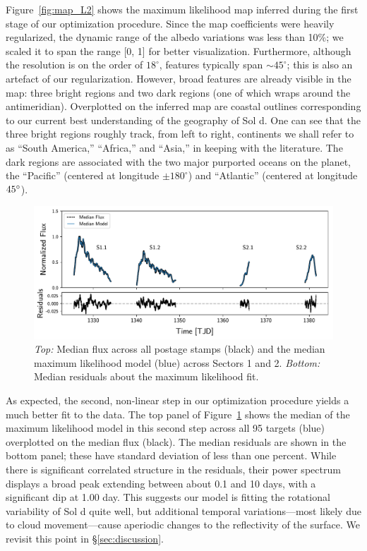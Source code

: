 \documentclass[modern]{aastex62}
\begin{document}
Figure~\ref{fig:map_L2} shows the maximum likelihood map inferred
during the first stage of our optimization procedure. Since the map
coefficients were heavily regularized, the dynamic range of the albedo
variations was less than 10\%; we scaled it to span the range [0, 1]
for better visualization. Furthermore, although the resolution is on 
the order of $18^\circ$, features typically span ${\sim}45^\circ$; this is
also an artefact of our regularization. However, broad features are already
visible in the map: three bright regions and two dark regions (one of which
wraps around the antimeridian). Overplotted on the inferred map are
coastal outlines corresponding to our current best understanding of 
the geography of Sol d. One can see that the three bright regions roughly
track, from left to right, continents we shall refer to as ``South America,''
``Africa,'' and ``Asia,'' in keeping with the literature. The dark regions
are associated with the two major purported oceans on the planet, the
``Pacific'' (centered at longitude $\pm180^\circ$) and ``Atlantic''
(centered at longitude $\-45^\circ$).

\begin{figure}[t!]
    \begin{centering}
    \includegraphics[width=\linewidth]{figures/model.pdf}
    \caption{\label{fig:model}
             \emph{Top:} Median flux across all postage stamps (black) and
             the median maximum likelihood model (blue) across Sectors 1 and 2.
             \emph{Bottom:} Median residuals about the maximum likelihood fit.
             }
    \end{centering}
\end{figure}

As expected, the second, non-linear step in our optimization procedure
yields a much better fit to the data.
The top panel of Figure~\ref{fig:model} shows the median of the 
maximum likelihood model in this second step
across all 95 targets (blue) overplotted on the median flux (black). 
The median residuals are shown in the bottom panel; these have
standard deviation of less than one percent. While there is significant correlated
structure in the residuals, their power spectrum displays a broad peak extending 
between about 0.1 and 10 days, with a significant dip at 1.00 day. This
suggests our model is fitting the rotational variability of Sol d quite well, but
additional temporal variations---most likely due to cloud movement---cause aperiodic
changes to the reflectivity of the surface. We revisit this point in \S\ref{sec:discussion}.
\end{document}
